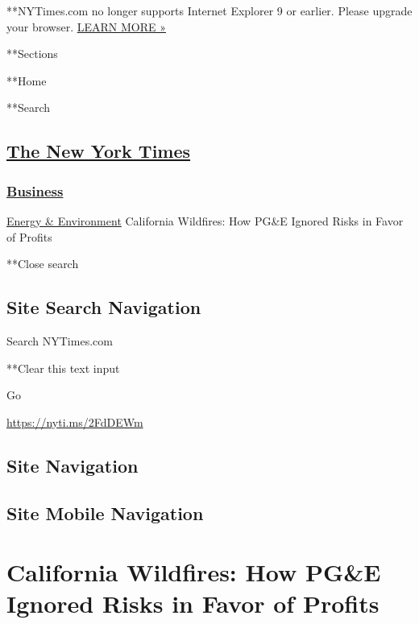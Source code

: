  **NYTimes.com no longer supports Internet Explorer 9 or earlier. Please
upgrade your browser.
\href{http://www.nytimes3xbfgragh.onion/content/help/site/ie9-support.html}{LEARN
MORE »}

**Sections

**Home

**Search

\hypertarget{the-new-york-times}{%
\subsection{\texorpdfstring{\href{http://www.nytimes3xbfgragh.onion/}{The
New York Times}}{The New York Times}}\label{the-new-york-times}}

\hypertarget{-business-}{%
\subsubsection{\texorpdfstring{ \href{/section/business}{Business}
}{ Business }}\label{-business-}}

 \href{/section/business/energy-environment}{Energy \& Environment}
\textbar{}California Wildfires: How PG\&E Ignored Risks in Favor of
Profits

**Close search

\hypertarget{site-search-navigation}{%
\subsection{Site Search Navigation}\label{site-search-navigation}}

Search NYTimes.com

**Clear this text input

Go

\url{https://nyti.ms/2FdDEWm}

\hypertarget{site-navigation}{%
\subsection{Site Navigation}\label{site-navigation}}

\hypertarget{site-mobile-navigation}{%
\subsection{Site Mobile Navigation}\label{site-mobile-navigation}}

\hypertarget{california-wildfires-how-pge-ignored-risks-in-favor-of-profits}{%
\section{California Wildfires: How PG\&E Ignored Risks in Favor of
Profits}\label{california-wildfires-how-pge-ignored-risks-in-favor-of-profits}}

